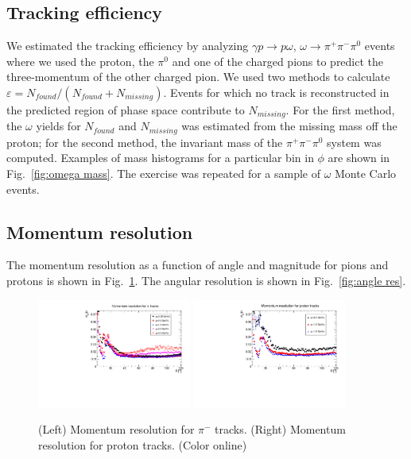 \subsection{Tracking efficiency}

We estimated the tracking efficiency by analyzing $\gamma p \rightarrow p \omega$, $\omega\rightarrow\pi^+\pi^-\pi^0$ events where we used the proton, the $\pi^0$ and one of the charged pions to predict the three-momentum of the other charged pion. We used two methods to calculate $\varepsilon=N_{found}/(N_{found}+N_{missing})$.  Events for which no track is reconstructed in the predicted region of 
phase space contribute to $N_{missing}$.  For the first method, the $\omega$ yields for $N_{found}$ and $N_{missing}$ was estimated from the missing mass off the 
proton; for the second method, the invariant mass of the $\pi^+\pi^-\pi^0$ system was computed.  Examples of mass histograms for a particular bin in $\phi$ are shown in Fig.~\ref{fig:omega mass}.  The exercise was repeated for a sample of $\omega$ Monte Carlo events.  


\subsection{Momentum resolution}

The momentum resolution as a function of angle and magnitude for pions and 
protons is shown in Fig.~\ref{fig:dp_p}.  The angular resolution is shown in 
Fig.~\ref{fig:angle res}.


\begin{figure}[tbp]
\begin{center}
\includegraphics[width=0.45\textwidth]{figures/PionMomentumResolution.pdf}
\includegraphics[width=0.45\textwidth]{figures/ProtonMomentumResolution.pdf}
\caption{\label{fig:dp_p} (Left) Momentum resolution for $\pi^-$ tracks.
(Right) Momentum resolution for proton tracks. (Color online)}
\end{center}
\end{figure}

